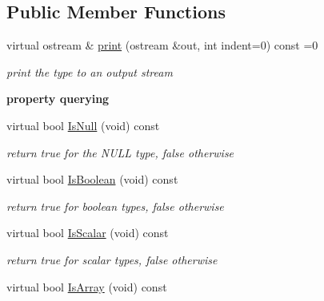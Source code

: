 \subsection*{Public Member Functions}
\begin{DoxyCompactItemize}
\item 
virtual ostream \& \hyperlink{classCType_aed5f7f1a93d166a2d9ce17e5e9053fe5}{print} (ostream \&out, int indent=0) const =0
\begin{DoxyCompactList}\small\item\em print the type to an output stream \end{DoxyCompactList}\end{DoxyCompactItemize}
\begin{Indent}{\bf property querying}\par
\begin{DoxyCompactItemize}
\item 
\hypertarget{classCType_a1f00968fff57bfc7a73c5ab4f125413a}{virtual bool \hyperlink{classCType_a1f00968fff57bfc7a73c5ab4f125413a}{Is\-Null} (void) const }\label{classCType_a1f00968fff57bfc7a73c5ab4f125413a}

\begin{DoxyCompactList}\small\item\em return {\itshape true} for the N\-U\-L\-L type, {\itshape false} otherwise \end{DoxyCompactList}\item 
\hypertarget{classCType_a88da735272105ffb9e836b64ee7a8afd}{virtual bool \hyperlink{classCType_a88da735272105ffb9e836b64ee7a8afd}{Is\-Boolean} (void) const }\label{classCType_a88da735272105ffb9e836b64ee7a8afd}

\begin{DoxyCompactList}\small\item\em return {\itshape true} for boolean types, {\itshape false} otherwise \end{DoxyCompactList}\item 
\hypertarget{classCType_af75216af22ea8c8845f15c6e72cf7a4f}{virtual bool \hyperlink{classCType_af75216af22ea8c8845f15c6e72cf7a4f}{Is\-Scalar} (void) const }\label{classCType_af75216af22ea8c8845f15c6e72cf7a4f}

\begin{DoxyCompactList}\small\item\em return {\itshape true} for scalar types, {\itshape false} otherwise \end{DoxyCompactList}\item 
\hypertarget{classCType_a108e19a508d6131a5a1fc802cdf59df8}{virtual bool \hyperlink{classCType_a108e19a508d6131a5a1fc802cdf59df8}{Is\-Array} (void) const }\label{classCType_a108e19a508d6131a5a1fc802cdf59df8}


\end{DoxyCompactItemize}
\end{Indent}
